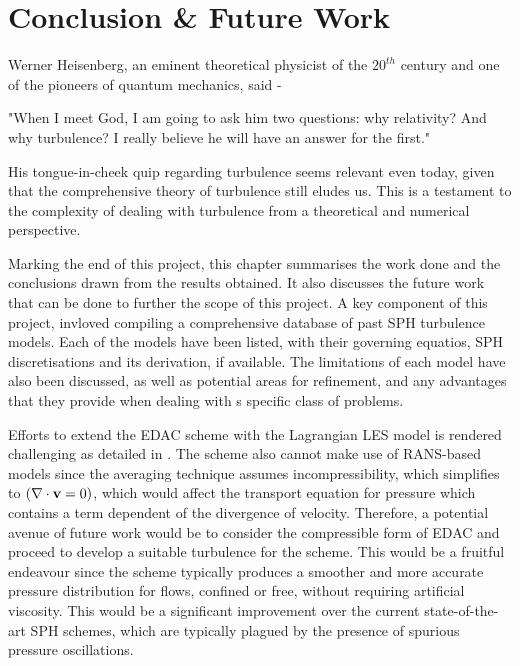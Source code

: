 
\chapter{Conclusion \& Future Work} %
\label{chap:conclusions-and-future-work}

Werner Heisenberg, an eminent theoretical physicist of the $20^{th}$ century and one of the pioneers of quantum mechanics, said -
\begin{displayquote}
    "When I meet God, I am going to ask him two questions: why relativity? And why turbulence? I really believe he will have an answer for the first."
\end{displayquote}
His tongue-in-cheek quip regarding turbulence seems relevant even today, given that the comprehensive theory of turbulence still eludes us. This is a testament to the complexity of dealing with turbulence from a theoretical and numerical perspective. 

Marking the end of this project, this chapter summarises the work done and the conclusions drawn from the results obtained. It also discusses the future work that can be done to further the scope of this project.
A key component of this project, invloved compiling a comprehensive database of past SPH turbulence models. Each of the models have been listed, with their governing equatios, SPH discretisations and its derivation, if available. The limitations of each model have also been discussed, as well as potential areas for refinement, and any advantages that they provide when dealing with s specific class of problems.

Efforts to extend the EDAC scheme \parencite{Ramachandran2019} with the Lagrangian LES model is rendered challenging as detailed in . The scheme also cannot make use of RANS-based models since the averaging technique assumes incompressibility, which simplifies to $(\nabla \cdot \mathbf{v} = 0)$, which would affect the transport equation for pressure  which contains a term dependent of the divergence of velocity.
Therefore, a potential avenue of future work would be to consider the compressible form of EDAC \parencite{Chola2021} and proceed to develop a suitable turbulence for the scheme. This would be a fruitful endeavour since the scheme typically produces a smoother and more accurate pressure distribution for flows, confined or free, without requiring artificial viscosity. This would be a significant improvement over the current state-of-the-art SPH schemes, which are typically plagued by the presence of spurious pressure oscillations.


